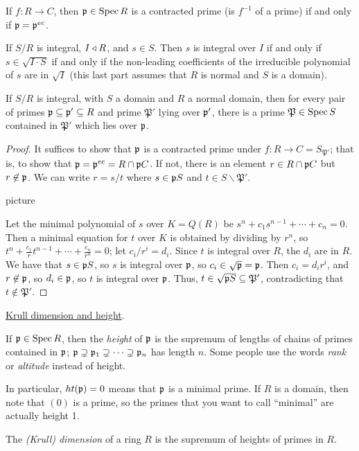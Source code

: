  \setcounter{lecture}{25}

 \begin{lemma}
   If $f:R\to C$, then $\mathfrak{p}\in \operatorname{Spec} R$ is a contracted prime (is $f^{-1}$ of a prime) if
   and only if $\mathfrak{p}=\mathfrak{p}^{ec}$.
 \end{lemma}
 \begin{lemma}
   If $S/R$ is integral, $I\triangleleft R$, and $s\in S$. Then $s$ is integral over $I$ if and only
   if $s\in \sqrt{I\cdot S}$ if and only if the non-leading coefficients of the
   irreducible polynomial of $s$ are in $\sqrt I$ (this last part assumes that $R$ is
   normal and $S$ is a domain).
 \end{lemma}

 \begin{theorem}
   If $S/R$ is integral, with $S$ a domain and $R$ a normal domain, then for every pair
   of primes $\mathfrak{p}\subseteq \mathfrak{p}'\subseteq R$ and prime $\mathfrak{P}'$ lying over $\mathfrak{p}'$,
   there is a prime $\mathfrak{P}\in \operatorname{Spec} S$ contained in $\mathfrak{P}'$ which lies
   over $\mathfrak{p}$.
 \end{theorem}
 \begin{proof}
   It suffices to show that $\mathfrak{p}$ is a contracted prime under $f:R\to
   C=S_{\mathfrak{P}'}$; that is, to show that $\mathfrak{p}=\mathfrak{p}^{ec}=R\cap \mathfrak{p} C$. If not, there is
   an element $r\in R\cap \mathfrak{p} C$ but $r\not\in \mathfrak{p}$. We can write $r= s/t$ where $s\in \mathfrak{p}
   S$ and $t\in S\smallsetminus \mathfrak{P}'$.

   picture

   Let the minimal polynomial of $s$ over $K=Q(R)$ be $s^n+c_1s^{n-1}+\cdots + c_n=0$.
   Then a minimal equation for $t$ over $K$ is obtained by dividing by $r^n$, so
   $t^n+\frac{c_1}{r} t^{n-1} + \cdots + \frac{c_n}{r^n}=0$; let $c_i/r^i=d_i$. Since $t$
   is integral over $R$, the $d_i$ are in $R$. We have that $s\in \mathfrak{p} S$, so $s$ is
   integral over $\mathfrak{p}$, so $c_i\in \sqrt {\mathfrak{p}}=\mathfrak{p}$. Then $c_i=d_i r^i$, and $r\not\in \mathfrak{p}$, so
   $d_i\in \mathfrak{p}$, so $t$ is integral over $\mathfrak{p}$. Thus, $t\in \sqrt {\mathfrak{p} S}\subseteq
   \mathfrak{P}'$, contradicting that $t\not\in \mathfrak{P}'$.
 \end{proof}

 \underline{Krull dimension and height}.
 \begin{definition}
   If $\mathfrak{p}\in \operatorname{Spec} R$, then the \emph{height} of $\mathfrak{p}$ is the supremum of lengths of
   chains of primes contained in $\mathfrak{p}$; $\mathfrak{p}\supsetneq \mathfrak{p}_1\supsetneq \cdots\supsetneq
   \mathfrak{p}_n$ has length $n$. Some people use the words \emph{rank} or \emph{altitude} instead
   of height.
 \end{definition}
 In particular, $ht(\mathfrak{p})=0$ means that $\mathfrak{p}$ is a minimal prime. If $R$ is a domain, then
 note that $(0)$ is a prime, so the primes that you want to call ``minimal'' are actually
 height 1.
 \begin{definition}
   The \emph{(Krull) dimension} of a ring $R$ is the supremum of heights of primes in
   $R$.
 \end{definition}

